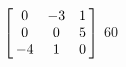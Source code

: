 {$\left[\hskip -3pt \begin{array}{ccc} 0&-3&1\\  0&0&5
\\  -4&1&0\end{array}\hskip -3pt \right]$} 
{$60$}



  

